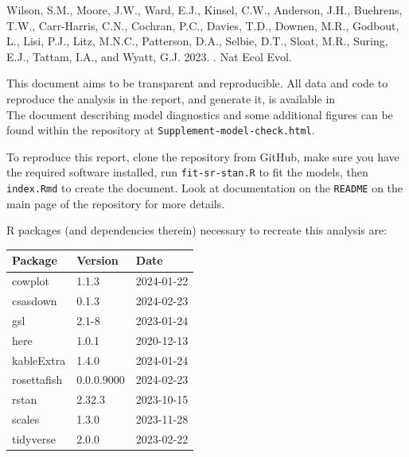 \documentclass[11pt]{book}
\begin{document}
\begin{CSLReferences}{1}{0}
%
Wilson, S.M., Moore, J.W., Ward, E.J., Kinsel, C.W., Anderson, J.H., Buehrens, T.W., Carr-Harris, C.N., Cochran, P.C., Davies, T.D., Downen, M.R., Godbout, L., Lisi, P.J., Litz, M.N.C., Patterson, D.A., Selbie, D.T., Sloat, M.R., Suring, E.J., Tattam, I.A., and Wyatt, G.J. 2023. . Nat Ecol Evol.

\end{CSLReferences}
\setlength{\parindent}{0in} \setlength{\leftskip}{0in} \setlength{\parskip}{4pt}

\Appendices


\clearpage

\label{app:a}

This document aims to be transparent and reproducible. All data and code to reproduce the analysis in the report, and generate it, is available in  \\
The document describing model diagnostics and some additional figures can be found within the repository at \texttt{Supplement-model-check.html}.

To reproduce this report, clone the repository from GitHub, make sure you have the required software installed, run \texttt{fit-sr-stan.R} to fit the models, then \texttt{index.Rmd} to create the document. Look at documentation on the \texttt{README} on the main page of the repository for more details.

R packages (and dependencies therein) necessary to recreate this analysis are:
\begin{longtable}[]{@{}lll@{}}
\toprule\noalign{}
Package & Version & Date \\
\midrule\noalign{}
\endhead
\bottomrule\noalign{}
\endlastfoot
cowplot & 1.1.3 & 2024-01-22 \\
csasdown & 0.1.3 & 2024-02-23 \\
gsl & 2.1-8 & 2023-01-24 \\
here & 1.0.1 & 2020-12-13 \\
kableExtra & 1.4.0 & 2024-01-24 \\
rosettafish & 0.0.0.9000 & 2024-02-23 \\
rstan & 2.32.3 & 2023-10-15 \\
scales & 1.3.0 & 2023-11-28 \\
tidyverse & 2.0.0 & 2023-02-22 \\
\end{longtable}
\end{document}
